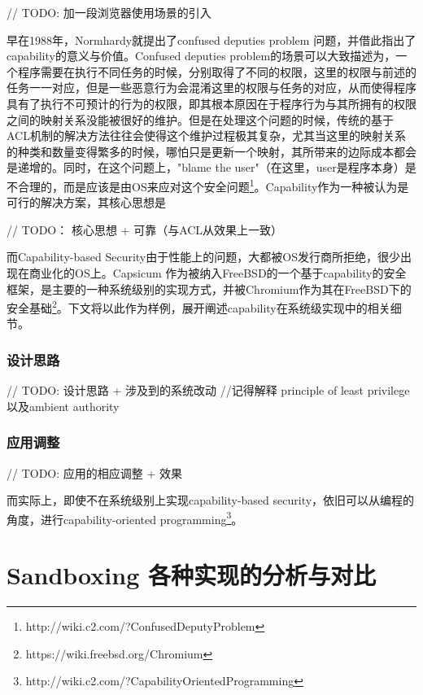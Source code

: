 \documentclass[final,12pt]{elsarticle}
\begin{document}
// TODO: 加一段浏览器使用场景的引入

早在1988年，Normhardy就提出了confused deputies problem \cite{deputies} 问题，并借此指出了capability的意义与价值。Confused deputies problem的场景可以大致描述为，一个程序需要在执行不同任务的时候，分别取得了不同的权限，这里的权限与前述的任务一一对应，但是一些恶意行为会混淆这里的权限与任务的对应，从而使得程序具有了执行不可预计的行为的权限，即其根本原因在于程序行为与其所拥有的权限之间的映射关系没能被很好的维护。但是在处理这个问题的时候，传统的基于ACL机制的解决方法往往会使得这个维护过程极其复杂，尤其当这里的映射关系的种类和数量变得繁多的时候，哪怕只是更新一个映射，其所带来的边际成本都会是递增的。同时，在这个问题上，"blame the user"（在这里，user是程序本身）是不合理的，而是应该是由OS来应对这个安全问题\footnote{http://wiki.c2.com/?ConfusedDeputyProblem}。Capability作为一种被认为是可行的解决方案，其核心思想是

// TODO： 核心思想 + 可靠（与ACL从效果上一致）

而Capability-based Security由于性能上的问题，大都被OS发行商所拒绝，很少出现在商业化的OS上。Capsicum \cite{capsicum} 作为被纳入FreeBSD的一个基于capability的安全框架，是主要的一种系统级别的实现方式，并被Chromium作为其在FreeBSD下的安全基础\footnote{https://wiki.freebsd.org/Chromium}。下文将以此作为样例，展开阐述capability在系统级实现中的相关细节。

\subsubsection{设计思路}
\label{sss:design}

// TODO: 设计思路 + 涉及到的系统改动
//记得解释 principle of least privilege以及ambient authority

\subsubsection{应用调整}
\label{sss:adoption}

// TODO: 应用的相应调整 + 效果

而实际上，即使不在系统级别上实现capability-based security，依旧可以从编程的角度，进行capability-oriented programming\footnote{http://wiki.c2.com/?CapabilityOrientedProgramming}。

\section{Sandboxing 各种实现的分析与对比}
\label{s:evaluation}

\end{document}
